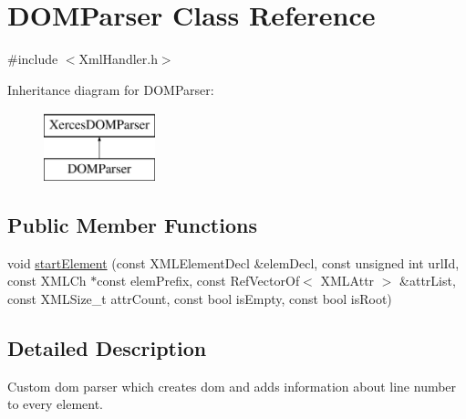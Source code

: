 \hypertarget{class_d_o_m_parser}{\section{D\+O\+M\+Parser Class Reference}
\label{class_d_o_m_parser}
}


{\ttfamily \#include $<$Xml\+Handler.\+h$>$}

Inheritance diagram for D\+O\+M\+Parser\+:\begin{figure}[H]
\begin{center}
\leavevmode
\includegraphics[height=2.000000cm]{class_d_o_m_parser}
\end{center}
\end{figure}
\subsection*{Public Member Functions}
\begin{DoxyCompactItemize}
\item 
void \hyperlink{class_d_o_m_parser_ad1d0d1baa8de927488a0a528d6ef0298}{start\+Element} (const X\+M\+L\+Element\+Decl \&elem\+Decl, const unsigned int url\+Id, const X\+M\+L\+Ch $\ast$const elem\+Prefix, const Ref\+Vector\+Of$<$ X\+M\+L\+Attr $>$ \&attr\+List, const X\+M\+L\+Size\+\_\+t attr\+Count, const bool is\+Empty, const bool is\+Root)
\end{DoxyCompactItemize}


\subsection{Detailed Description}
Custom dom parser which creates dom and adds information about line number to every element. 

